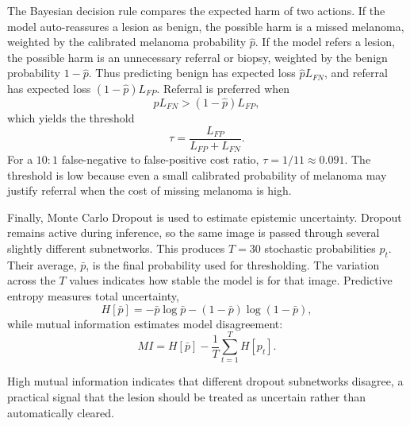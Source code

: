\documentclass[11pt,a4paper]{article}
\begin{document}
The Bayesian decision rule compares the expected harm of two actions. If the model auto-reassures a lesion as benign, the possible harm is a missed melanoma, weighted by the calibrated melanoma probability $\hat{p}$. If the model refers a lesion, the possible harm is an unnecessary referral or biopsy, weighted by the benign probability $1-\hat{p}$. Thus predicting benign has expected loss $\hat{p}L_{FN}$, and referral has expected loss $(1-\hat{p})L_{FP}$. Referral is preferred when
\begin{equation}
    \hat{p}L_{FN} > (1-\hat{p})L_{FP},
\end{equation}
which yields the threshold
\begin{equation}
    \tau = \frac{L_{FP}}{L_{FP}+L_{FN}}.
\end{equation}
\noindent For a $10:1$ false-negative to false-positive cost ratio, $\tau=1/11 \approx 0.091$. The threshold is low because even a small calibrated probability of melanoma may justify referral when the cost of missing melanoma is high.

Finally, Monte Carlo Dropout is used to estimate epistemic uncertainty. Dropout remains active during inference, so the same image is passed through several slightly different subnetworks. This produces $T=30$ stochastic probabilities $p_t$. Their average, $\bar{p}$, is the final probability used for thresholding. The variation across the $T$ values indicates how stable the model is for that image. Predictive entropy measures total uncertainty,
\begin{equation}
    H[\bar{p}] = -\bar{p}\log\bar{p}-(1-\bar{p})\log(1-\bar{p}),
\end{equation}
while mutual information estimates model disagreement:
\begin{equation}
    MI = H[\bar{p}] - \frac{1}{T}\sum_{t=1}^{T}H[p_t].
\end{equation}

\noindent High mutual information indicates that different dropout subnetworks disagree, a practical signal that the lesion should be treated as uncertain rather than automatically cleared.
\end{document}
